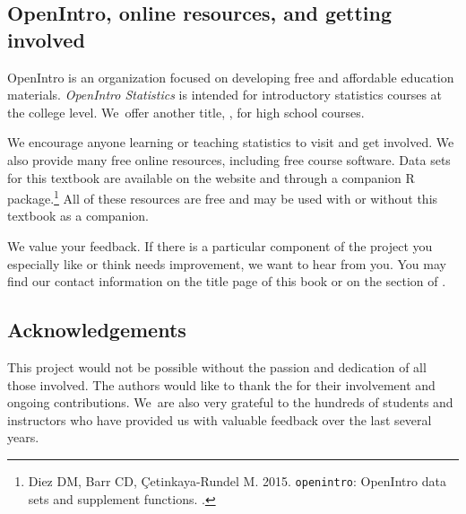 \subsection*{OpenIntro, online resources, and getting involved}

OpenIntro is an organization focused on developing free and affordable education materials. \emph{OpenIntro Statistics} is intended for introductory statistics courses at the college level. We~offer another title, , for high school courses.

We encourage anyone learning or teaching statistics to visit  and get involved. We also provide many free online resources, including free course software. Data sets for this textbook are available on the website and through a companion R package.\footnote{Diez DM, Barr CD, \c{C}etinkaya-Rundel M. 2015. \texttt{openintro}: OpenIntro data sets and supplement functions. .} All of these resources are free and may be used with or without this textbook as a companion.

We value your feedback. If there is a particular component of the project you especially like or think needs improvement, we want to hear from you. You may find our contact information on the title page of this book or on the  section of .

\subsection*{Acknowledgements}

This project would not be possible without the passion and dedication of all those involved. %
The authors would like to thank the  for their involvement and ongoing contributions. We~are also very grateful to the hundreds of students and instructors who have provided us with valuable feedback over the last several years.
